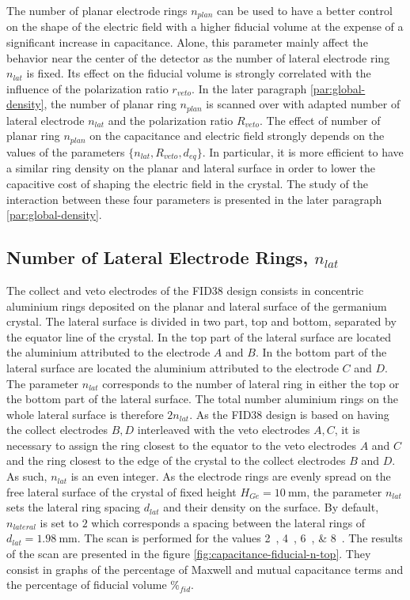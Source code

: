 The number of planar electrode rings $n_{plan}$ can be used to have a better control on the shape of the electric field with a higher fiducial volume at the expense of a significant increase in capacitance. Alone, this parameter mainly affect the behavior near the center of the detector as the number of lateral electrode ring $n_{lat}$ is fixed. Its effect on the fiducial volume is strongly correlated with the influence of the polarization ratio $r_{veto}$. In the later paragraph \ref{par:global-density}, the number of planar ring $n_{plan}$ is scanned over with adapted number of lateral electrode $n_{lat}$ and the polarization ratio $R_{veto}$.
The effect of number of planar ring $n_{plan}$ on the capacitance and electric field strongly depends on the values of the parameters $\{n_{lat}, R_{veto}, d_{eq}\}$. In particular, it is more efficient to have a similar ring density on the planar and lateral surface in order to lower the capacitive cost of shaping the electric field in the crystal. The study of the interaction between these four parameters is presented in the later paragraph \ref{par:global-density}.


\subsection{Number of Lateral Electrode Rings, $n_{lat}$}
\label{par:n-lat}

The collect and veto electrodes of the FID38 design consists in concentric aluminium rings deposited on the planar and lateral surface of the germanium crystal. The lateral surface is divided in two part, top and bottom, separated by the equator line of the crystal. In the top part of the lateral surface are located the aluminium attributed to the electrode $A$ and $B$. In the bottom part of the lateral surface are located the aluminium attributed to the electrode $C$ and $D$. The parameter $n_{lat}$ corresponds to the number of lateral ring in either the top or the bottom part of the lateral surface. The total number aluminium rings on the whole lateral surface is therefore $2 n_{lat}$. As the FID38 design is based on having the collect electrodes $B,D$ interleaved with the veto electrodes $A,C$, it is necessary to assign the ring closest to the equator to the veto electrodes $A$ and $C$ and the ring closest to the edge of the crystal to the collect electrodes $B$ and $D$. As such, $n_{lat}$ is an even integer. As the electrode rings are evenly spread on the free lateral surface of the crystal of fixed height $H_{Ge}=\SI{10}{\mm}$, the parameter $n_{lat}$ sets the lateral ring spacing $d_{lat}$ and their density on the surface. By default, $n_{lateral}$ is set to $2$ which corresponds a spacing between the lateral rings of $d_{lat}=\SI{1.98}{\mm}$.  The scan is performed for the values \SIlist{2; 4; 6; 8}{}. The results of the scan are presented in the figure \ref{fig:capacitance-fiducial-n-top}. They consist in graphs of the percentage of Maxwell and mutual capacitance terms and the percentage of fiducial volume $\%_{fid}$.

